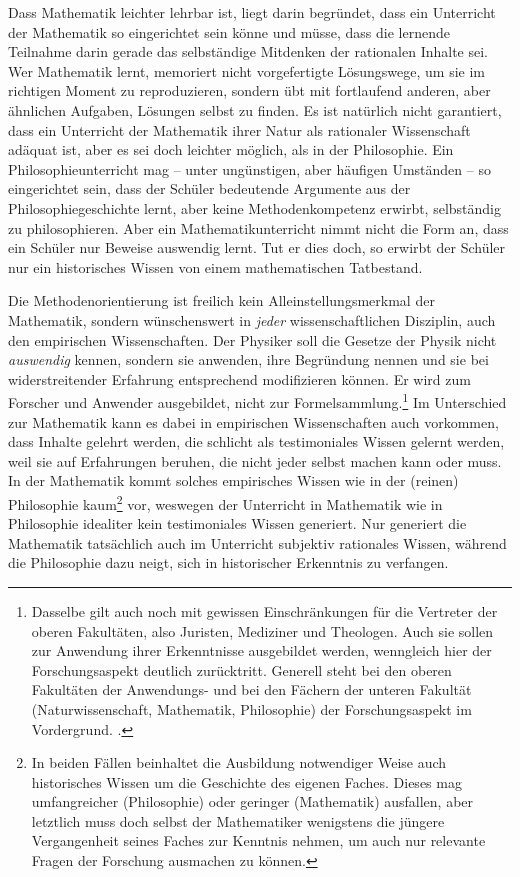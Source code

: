 Dass Mathematik leichter lehrbar ist, liegt darin begründet, dass ein Unterricht
der Mathematik so eingerichtet sein könne und müsse, dass die lernende Teilnahme
darin gerade das selbständige Mitdenken der rationalen Inhalte sei. Wer
Mathematik lernt, memoriert nicht vorgefertigte Lösungswege, um sie im richtigen
Moment zu reproduzieren, sondern übt mit fortlaufend anderen, aber
ähnlichen Aufgaben, Lösungen selbst zu finden. Es ist natürlich nicht
garantiert, dass ein Unterricht der Mathematik ihrer Natur als rationaler
Wissenschaft adäquat ist, aber es sei doch leichter möglich, als in der
Philosophie. Ein Philosophieunterricht mag -- unter ungünstigen, aber häufigen
Umständen -- so eingerichtet sein, dass der Schüler bedeutende Argumente aus der
Philosophiegeschichte lernt, aber keine Methodenkompetenz erwirbt, selbständig
zu philosophieren. Aber ein Mathematikunterricht nimmt nicht die Form an, dass
ein Schüler nur Beweise auswendig lernt. Tut er dies doch, so erwirbt der
Schüler nur ein historisches Wissen von einem mathematischen Tatbestand.

Die Methodenorientierung ist freilich kein Alleinstellungsmerkmal der
Mathematik, sondern wünschenswert in \emph{jeder} wissenschaftlichen Disziplin,
auch den empirischen Wissenschaften. Der Physiker
soll die Gesetze der Physik nicht \emph{auswendig} kennen, sondern sie anwenden,
ihre Begründung nennen und sie bei widerstreitender Erfahrung entsprechend
modifizieren können. Er wird zum Forscher und Anwender ausgebildet, nicht zur
Formelsammlung.\footnote{Dasselbe gilt auch noch mit gewissen Einschränkungen
für die Vertreter der oberen Fakultäten, also Juristen, Mediziner und Theologen.
Auch sie sollen zur Anwendung ihrer Erkenntnisse ausgebildet werden, wenngleich
hier der Forschungsaspekt deutlich zurücktritt. Generell steht bei den oberen
Fakultäten der Anwendungs- und bei den Fächern der unteren Fakultät
(Naturwissenschaft, Mathematik, Philosophie) der Forschungsaspekt im
Vordergrund. .} Im Unterschied zur Mathematik kann es dabei in
empirischen Wissenschaften auch vorkommen, dass Inhalte gelehrt
werden, die schlicht als testimoniales Wissen gelernt werden,
weil sie auf Erfahrungen beruhen, die nicht jeder selbst machen kann oder muss.
In der Mathematik kommt solches empirisches Wissen wie in der (reinen)
Philosophie kaum\footnote{In beiden Fällen beinhaltet die Ausbildung notwendiger
Weise auch historisches Wissen um die Geschichte des eigenen Faches. Dieses mag
umfangreicher (Philosophie) oder geringer (Mathematik) ausfallen, aber
letztlich muss doch selbst der Mathematiker wenigstens die jüngere
Vergangenheit seines Faches zur Kenntnis nehmen, um auch nur relevante Fragen
der Forschung ausmachen zu können.} vor, weswegen der Unterricht in Mathematik
wie in Philosophie idealiter kein testimoniales Wissen generiert. Nur generiert
die Mathematik tatsächlich auch im Unterricht subjektiv rationales Wissen,
während die Philosophie dazu neigt, sich in historischer Erkenntnis zu
verfangen.

